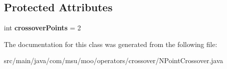 \subsection*{Protected Attributes}
\begin{DoxyCompactItemize}
\item 
\hypertarget{classcom_1_1msu_1_1moo_1_1operators_1_1crossover_1_1NPointCrossover_3_01T_01_4_a39425dd875d76ad48be0b3af8f50f0a2}{int {\bfseries crossover\-Points} = 2}\label{classcom_1_1msu_1_1moo_1_1operators_1_1crossover_1_1NPointCrossover_3_01T_01_4_a39425dd875d76ad48be0b3af8f50f0a2}

\end{DoxyCompactItemize}


The documentation for this class was generated from the following file\-:\begin{DoxyCompactItemize}
\item 
src/main/java/com/msu/moo/operators/crossover/N\-Point\-Crossover.\-java\end{DoxyCompactItemize}
